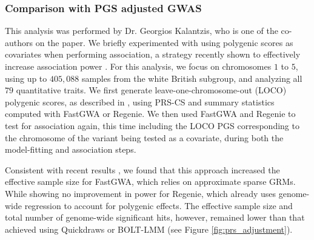 \subsubsection{Comparison with PGS adjusted GWAS}

This analysis was performed by Dr. Georgios Kalantzis, who is one of the co-authors on the paper.
%
We briefly experimented with using polygenic scores as covariates when performing association, a strategy recently shown to effectively increase association power \cite{bennett2021controlling, campos2023boosting, jurgens2023adjusting}.
%
For this analysis, we focus on chromosomes $1$ to $5$, using up to $405{,}088$ samples from the white British subgroup, and analyzing all $79$ quantitative traits.
%
We first generate leave-one-chromosome-out (LOCO) polygenic scores, as described in \cite{bennett2021controlling}, using PRS-CS and summary statistics computed with FastGWA or Regenie.
%
We then used FastGWA and Regenie to test for association again, this time including the LOCO PGS corresponding to the chromosome of the variant being tested as a covariate, during both the model-fitting and association steps.

%
Consistent with recent results \cite{bennett2021controlling, jurgens2023adjusting}, we found that this approach increased the effective sample size for FastGWA, which relies on approximate sparse GRMs.
%
While showing no improvement in power for Regenie, which already uses genome-wide regression to account for polygenic effects.
%
The effective sample size and total number of genome-wide significant hits, however, remained lower than that achieved using Quickdraws or BOLT-LMM (see Figure \ref{fig:prs_adjustment}).
%

